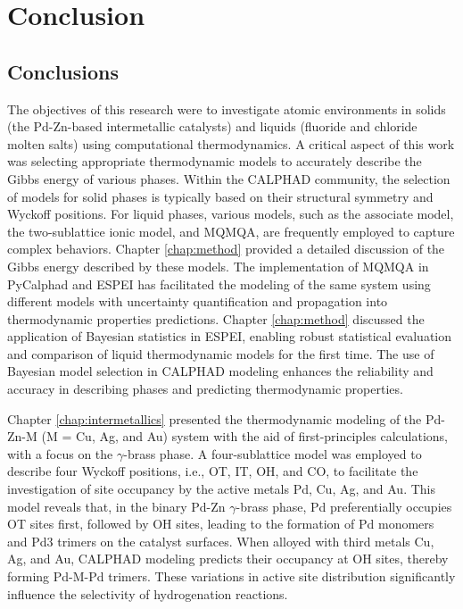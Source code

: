 \chapter{Conclusion} \label{chap:conclusion}

\section{Conclusions} \label{conclusion:sec:conclusions}
The objectives of this research were to investigate atomic environments in solids (the Pd-Zn-based intermetallic catalysts) and liquids (fluoride and chloride molten salts) using computational thermodynamics. A critical aspect of this work was selecting appropriate thermodynamic models to accurately describe the Gibbs energy of various phases. Within the CALPHAD community, the selection of models for solid phases is typically based on their structural symmetry and Wyckoff positions. For liquid phases, various models, such as the associate model, the two-sublattice ionic model, and MQMQA, are frequently employed to capture complex behaviors. Chapter \ref{chap:method} provided a detailed discussion of the Gibbs energy described by these models. The implementation of MQMQA in PyCalphad and ESPEI has facilitated the modeling of the same system using different models with uncertainty quantification and propagation into thermodynamic properties predictions. Chapter \ref{chap:method} discussed the application of Bayesian statistics in ESPEI, enabling robust statistical evaluation and comparison of liquid thermodynamic models for the first time. The use of Bayesian model selection in CALPHAD modeling enhances the reliability and accuracy in describing phases and predicting thermodynamic properties. 

Chapter \ref{chap:intermetallics} presented the thermodynamic modeling of the Pd-Zn-M (M = Cu, Ag, and Au) system with the aid of first-principles calculations, with a focus on the $\gamma$-brass phase. A four-sublattice model was employed to describe four Wyckoff positions, i.e., OT, IT, OH, and CO, to facilitate the investigation of site occupancy by the active metals Pd, Cu, Ag, and Au. This model reveals that, in the binary Pd-Zn $\gamma$-brass phase, Pd preferentially occupies OT sites first, followed by OH sites, leading to the formation of Pd monomers and Pd3 trimers on the catalyst surfaces. When alloyed with third metals Cu, Ag, and Au, CALPHAD modeling predicts their occupancy at OH sites, thereby forming Pd-M-Pd trimers. These variations in active site distribution significantly influence the selectivity of hydrogenation reactions.

